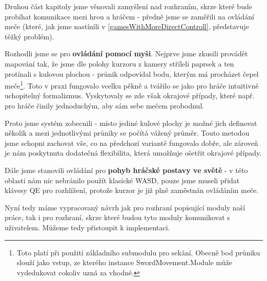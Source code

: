 \bigbreak

Druhou část kapitoly jsme věnovali zamyšlení nad rozhraním, skrze které bude probíhat komunikace mezi hrou a hráčem - předně jsme se zaměřili na ovládání meče (které, jak jsme nastínili v \ref{gamesWithMoreDirectControll}, představuje těžký problém).

Rozhodli jsme se pro \textbf{ovládání pomocí myši}. Nejprve jsme zkusili provádět mapování tak, že jsme dle polohy kurzoru z kamery stříleli paprsek a ten protínali s kulovou plochou - průnik odpovídal bodu, kterým má procházet čepel meče\footnote{Toto platí při použití základního submodulu pro sekání. Obecně bod průniku slouží jako vstup, ze kterého instance SwordMovement.Module může vydedukovat cokoliv uzná za vhodné.}. Toto v praxi fungovalo vcelku pěkně a tvářilo se jako pro hráče intuitivně uchopitelný formalizmus. Vyskytovaly se zde však okrajové případy, které např. pro hráče činily jednoduchým, aby sám sebe mečem probodnul.

Proto jsme systém zobecnili - místo jediné kulové plochy je možné jich definovat několik a mezi jednotlivými průniky se počítá vážený průměr. Touto metodou jsme schopni zachovat vše, co na předchozí variantě fungovalo dobře, ale zároveň je nám poskytnuta dodatečná flexibilita, která umožňuje ošetřit okrajové případy.

Dále jsme stanovili ovládání pro \textbf{pohyb hráčské postavy ve světě} - v této oblasti nám nic nebránilo použít klasické WASD, pouze jsme museli přidat klávesy QE pro rozhlížení, protože kurzor je již plně zaměstnán ovládáním meče.

\bigbreak
Nyní tedy máme vypracovaný návrh jak pro rozhraní popisující moduly naší práce, tak i pro rozhraní, skrze které budou tyto moduly komunikovat s uživatelem. Můžeme tedy přistoupit k implementaci.
